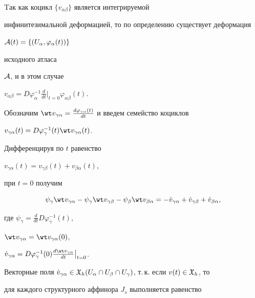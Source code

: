 \begin{pf}


Tак как коцикл $\{v_{\alpha \beta}\}$ является интегрируемой


инфинитезимальной деформацией, то по определению существует деформация


${\cal A}(t)=\{(U_{\alpha}, \varphi_{\alpha}(t))\}$


исходного атласа


${\cal A} $, и в этом случае


$v_{\alpha \beta} =


D\varphi_{\alpha}^{-1}\frac{d}{dt} \big|_{t=0} \varphi_{\alpha


\beta}(t)$.


Обозначим $ \wt v_{\gamma \alpha}=\frac{d\varphi_{\gamma \alpha


}(t)}{dt}$ и введем семейство коциклов


$v_{\gamma \alpha}(t)=D\varphi_{\gamma}^{-1}(t)\wt v_{\gamma\alpha}(t)$.


Дифференцируя по $t$ равенство


$v_{\gamma \alpha}(t) =v_{\gamma \beta}(t) + v_{\beta \alpha}(t)$,


при $t=0$ получим


\begin{equation}


\psi_{\gamma} \wt v_{\gamma \alpha} -


\psi_{\gamma} \wt v_{\gamma \beta} -


\psi_{\beta} \wt v_{\beta \alpha} =


- \Dot v_{\gamma \alpha}


+ \Dot v_{\gamma \beta} + \Dot v_{\beta \alpha},


\end{equation}


где $\psi_{\gamma}=\frac{d}{dt}D\varphi_{\gamma}^{-1}(t)$,


$ \wt v_{\gamma \alpha}=\wt v_{\gamma \alpha}(0)$,


$\Dot v_{\gamma \alpha}=D\varphi_{\gamma}^{-1}(0)\frac{d\wt


v_{\gamma \alpha}}{dt}\big|_{t=0}$.





Векторные поля $\Dot v_{\gamma \alpha}\in {\frak X}_h(U_{\alpha}\cap


U_{\beta}\cap U_{\gamma})$, т.\,к. если $v(t)\in {\frak X}_h$, то


для каждого структурного аффинора $J_{s}$ выполняется равенство



\end{pf}
